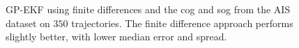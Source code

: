 \begin{figure}[h]
    \centering
    \caption{GP-EKF using finite differences and the \acrshort{cog} and \acrshort{sog} from the AIS dataset on $350$ trajectories. The finite difference approach performs slightly better, with lower median error and spread.}
    \label{fig:stats_gp_ekf_fd_vs_cog}
\end{figure}


